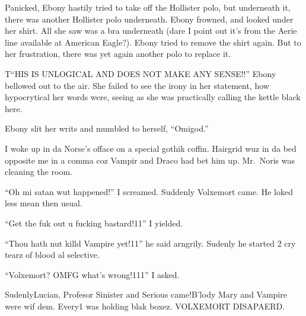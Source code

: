 \begin{sloppypar}
    Panicked, Ebony hastily tried to take off the Hollister polo, but underneath it, there was another Hollister polo underneath. Ebony frowned, and looked under her shirt. All she saw was a bra underneath (dare I point out it's from the Aerie line available at American Eagle?). Ebony tried to remove the shirt again. But to her frustration, there was yet again another polo to replace it.
\end{sloppypar}

\begin{sloppypar}
    T\enquote{HIS IS UNLOGICAL AND DOES NOT MAKE ANY SENSE!!} Ebony bellowed out to the air. She failed to see the irony in her statement, how hypocrytical her words were, seeing as she was practically calling the kettle black here.
\end{sloppypar}

Ebony slit her writs and mumbled to herself, \enquote{Omigod.}


\vspace{1em}




I woke up in da Norse's offace on a special gothik coffin. Hairgrid wuz in da bed opposite me in a comma coz Vampir and Draco had bet him up. Mr.~Noris was cleaning the room.

\enquote{Oh mi satan wut happened!} I screamed. Suddenly Volxemort came. He loked less mean then usual.

\enquote{Get the fuk out u fucking bastard!11} I yielded.

\enquote{Thou hath nut killd Vampire yet!11} he said arngrily. Sudenly he started 2 cry tearz of blood al selective.

\enquote{Volxemort? OMFG what's wrong!111} I asked.

Sudenly\dotfill Lucian, Profesor Sinister and Serious came!\newline B'lody Mary and Vampire were wif dem. Every1 was holding blak boxez. VOLXEMORT DISAPAERD\@.

